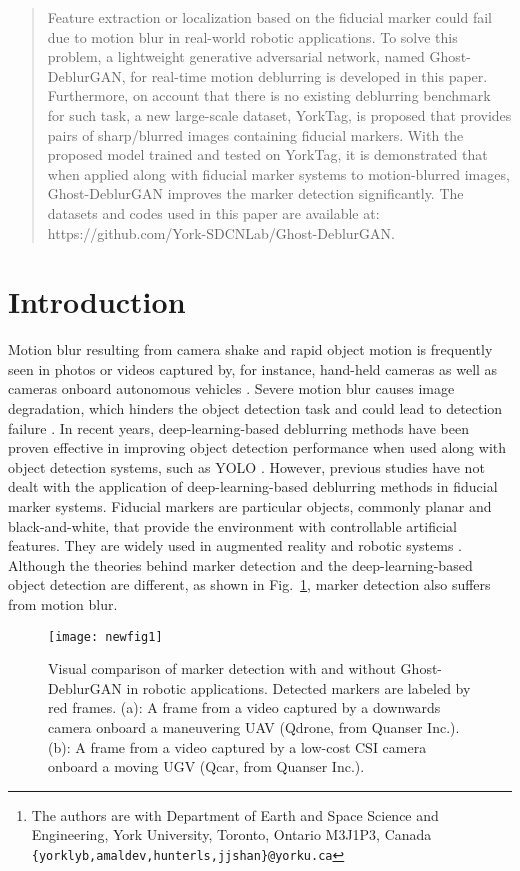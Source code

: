 \documentclass[letterpaper, 10 pt, conference]{ieeeconf}
\author{Yibo Liu, Amaldev Haridevan, Hunter Schofield, Jinjun Shan\thanks{The authors are with Department of Earth and Space Science and Engineering, York University, Toronto, Ontario M3J1P3, Canada 
        {\tt\footnotesize \{yorklyb,amaldev,hunterls,jjshan\}@yorku.ca}}}
\begin{document}
\maketitle
\thispagestyle{empty}
\pagestyle{empty}


\begin{abstract}
Feature extraction or localization based on the fiducial marker could fail due to motion blur in real-world robotic applications. To solve this problem, a lightweight generative  adversarial  network, named Ghost-DeblurGAN, for real-time motion deblurring is developed in this paper. Furthermore, on account that there is no existing deblurring benchmark for such task, a new large-scale dataset, YorkTag, is proposed that provides pairs of sharp/blurred images containing fiducial markers. With the proposed model trained and tested on YorkTag, it is demonstrated that when applied along with fiducial marker systems to motion-blurred images, Ghost-DeblurGAN improves the marker detection significantly. The datasets and codes used in this paper are available at: https://github.com/York-SDCNLab/Ghost-DeblurGAN.

\end{abstract}

\IEEEpeerreviewmaketitle



\section{Introduction}
Motion blur resulting from camera shake and rapid object motion is frequently seen in photos or videos captured by, for instance, hand-held cameras as well as cameras onboard autonomous vehicles \cite{deblurgan1,deblurgan2,nah}. Severe motion blur causes image degradation, which hinders the object detection task and could lead to detection failure \cite{bert}. In recent years, deep-learning-based deblurring methods \cite{deblurgan1,nah,sayed} have been proven effective in improving object detection performance when used along with object detection systems, such as YOLO \cite{redmon}.  However, previous studies have not dealt with the application of deep-learning-based deblurring methods in fiducial marker systems. Fiducial markers \cite{wang,ap3,aruco} are particular objects, commonly planar and  black-and-white, that provide the environment with controllable artificial features. They are widely used in augmented reality and robotic systems \cite{olson,ap3}. Although the theories behind marker detection \cite{wang,ap3,aruco} and the deep-learning-based object detection \cite{redmon,bert} are different, as shown in Fig.~\ref{fig1}, marker detection also suffers from motion blur.
\begin{figure}[htpb]
	\centering
	\texttt{[image: newfig1]}
\caption{Visual comparison of marker detection with and without Ghost-DeblurGAN in robotic applications. Detected markers are labeled by red frames. (a):  A frame from a video captured by a downwards camera onboard a maneuvering UAV (Qdrone, from Quanser Inc.). (b): A frame from a video captured by a low-cost CSI camera onboard a moving UGV (Qcar, from Quanser Inc.). }
	\label{fig1}
\end{figure} 
\end{document}

